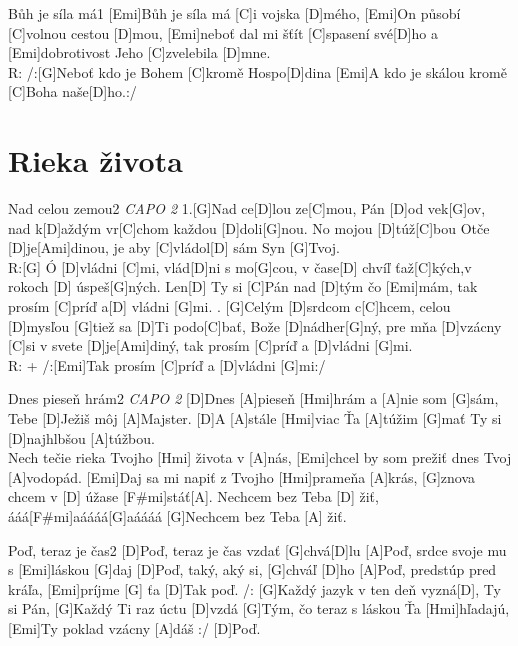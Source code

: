 \documentclass[12pt]{article}
\begin{document}
\begin{song}{Bůh je síla má}{1}
	[Emi]Bůh je síla má [C]i vojska [D]mého,
	[Emi]On působí [C]volnou cestou [D]mou,
	[Emi]neboť dal mi šťít [C]spasení své[D]ho
	a [Emi]dobrotivost Jeho [C]zvelebila [D]mne.
	\\
	R: /:[G]Neboť kdo je Bohem [C]kromě Hospo[D]dina
	[Emi]A kdo je skálou kromě [C]Boha naše[D]ho.:/
\end{song}

\newpage
	
\section{Rieka života}
\begin{song}{Nad celou zemou}{2}
	\textit{CAPO 2}
	1.[G]Nad ce[D]lou ze[C]mou, Pán [D]od vek[G]ov,
	nad k[D]aždým vr[C]chom každou [D]doli[G]nou.
	No mojou [D]túž[C]bou Otče [D]je[Ami]dinou,
	je aby [C]vládol[D] sám Syn [G]Tvoj.
	\\
	R:[G] Ó [D]vládni [C]mi, vlád[D]ni s mo[G]cou,
	v čase[D] chvíľ ťaž[C]kých,v rokoch [D] úspeš[G]ných.
	Len[D] Ty si [C]Pán nad [D]tým čo [Emi]mám,
	tak prosím [C]príď a[D] vládni [G]mi.
	. [G]Celým [D]srdcom c[C]hcem, celou [D]mysľou [G]tiež 
	sa [D]Ti podo[C]bať, Bože [D]nádher[G]ný, 
	pre mňa [D]vzácny [C]si v svete [D]je[Ami]diný, 
	tak prosím [C]príď a [D]vládni [G]mi.
	\\
	R: + /:[Emi]Tak prosím [C]príď a [D]vládni [G]mi:/
\end{song}
	
\begin{song}{Dnes pieseň hrám}{2}
	\textit{CAPO 2}
	[D]Dnes [A]pieseň [Hmi]hrám a [A]nie som [G]sám, 
	Tebe [D]Ježiš môj [A]Majster.
	[D]A [A]stále [Hmi]viac Ťa [A]túžim [G]mať 
	Ty si [D]najhlbšou [A]túžbou.
	\\
	[Emi]Nech tečie rieka Tvojho [Hmi] života v [A]nás,
	[Emi]chcel by som prežiť dnes Tvoj [A]vodopád.
	[Emi]Daj sa mi napiť z Tvojho [Hmi]prameňa [A]krás,
	[G]znova chcem v [D] úžase [F#mi]stáť[A].
	\columnbreak
	Nechcem bez Teba [D] žiť,
	ááá[F#mi]aáááá[G]aáááá
	[G]Nechcem bez Teba [A] žiť.
\end{song}
	
\begin{song}{Poď, teraz je čas}{2}
[D]Poď, teraz je čas vzdať [G]chvá[D]lu
[A]Poď, srdce svoje mu s [Emi]láskou [G]daj
[D]Poď, taký, aký si, [G]chváľ [D]ho
[A]Poď, predstúp pred kráľa, [Emi]príjme [G] ťa
[D]Tak poď.
\columnbreak
/: [G]Každý jazyk v ten deň vyzná[D], Ty si Pán,
[G]Každý Ti raz úctu [D]vzdá
[G]Tým, čo teraz s láskou Ťa [Hmi]hľadajú,
[Emi]Ty poklad vzácny [A]dáš :/
[D]Poď.
\end{song}
\end{document}
